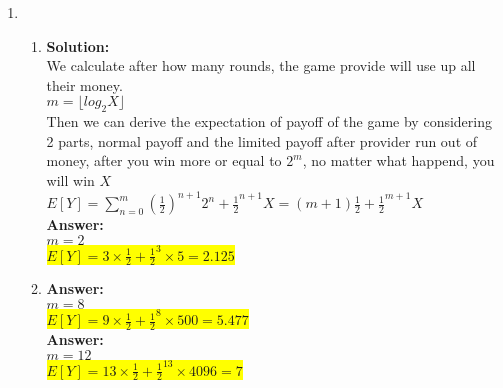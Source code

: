 \documentclass{article}
\newcommand{\myansw}{\textbf{Answer:}\\}
\newcommand{\mysolu}{\textbf{Solution:}\\}
\begin{document}
\thispagestyle{fancy} %

\begin{enumerate}
	\item
	\begin{enumerate}
		\item
		\mysolu
		We calculate after how many rounds, the game provide will use up all their money.\\
		${m = \lfloor log_{2}X \rfloor}$\\
		Then we can derive the expectation of payoff of the game by considering 2 parts, normal payoff and the limited payoff after provider run out of money, after you win more or equal to ${2^m}$, no matter what happend, you will win ${X}$\\
		${E[Y] = \sum\limits_{n = 0}^{m}(\frac{1}{2})^{n+1}2^n+\frac{1}{2}^{n+1} X= (m+1)  \frac{1}{2} + \frac{1}{2}^{m+1} X}$\\
		\myansw
		${m =2}$\\
		\colorbox{yellow}{
			${E[Y] = 3 \times  \frac{1}{2}+ \frac{1}{2}^{3} \times 5=2.125}$
		}\\
		\item
		\myansw
		${m =8}$\\
			\colorbox{yellow}{
			${E[Y] = 9 \times  \frac{1}{2}+ \frac{1}{2}^{8} \times 500=5.477}$
		}\\
	
		\myansw
		${m =12}$\\
		\colorbox{yellow}{
			${E[Y] = 13 \times  \frac{1}{2}+ \frac{1}{2}^{13} \times 4096=7}$
		}\\

	\end{enumerate}


\end{enumerate}
\end{document}
